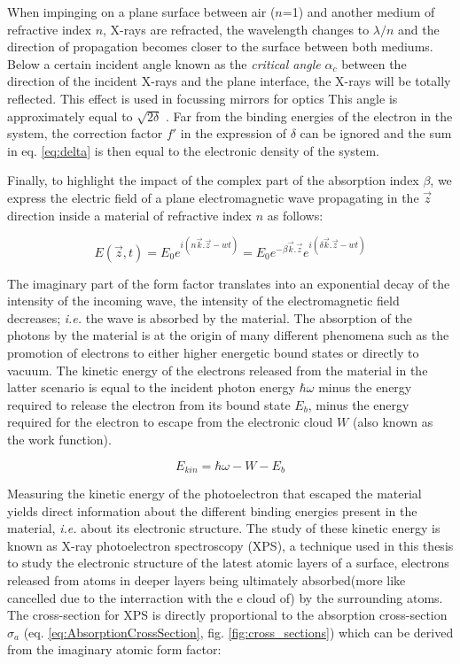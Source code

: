 When impinging on a plane surface between air ($n$=1) and another medium of refractive index $n$, X-rays are refracted, the wavelength changes to $\lambda/n$ and the direction of propagation becomes closer to the surface between both mediums.
Below a certain incident angle known as the \textit{critical angle} $\alpha_c$ between the direction of the incident X-rays and the plane interface, the X-rays will be totally reflected.
This effect is used in focussing mirrors for optics
This angle is approximately equal to $\sqrt{2\delta}$ \parencite{Willmott}.
Far from the binding energies of the electron in the system, the correction factor $f'$ in the expression of $\delta$ can be ignored and the sum in eq. \ref{eq:delta} is then equal to the electronic density of the system.

Finally, to highlight the impact of the complex part of the absorption index $\beta$, we express the electric field of a plane electromagnetic wave propagating in the $\vec{z}$ direction inside a material of refractive index $n$ as follows:

\begin{equation}
    E(\vec{z}, t) = E_0 e^{i(n\vec{k}.\vec{z} - wt)} = E_0 e^{-\beta \vec{k}.\vec{z}} e^{i(\delta\vec{k}.\vec{z} - wt)}
\end{equation}

The imaginary part of the form factor translates into an exponential decay of the intensity of the incoming wave, the intensity of the electromagnetic field decreases; \textit{i.e.} the wave is absorbed by the material.
The absorption of the photons by the material is at the origin of many different phenomena such as the promotion of electrons to either higher energetic bound states or directly to vacuum.
The kinetic energy of the electrons released from the material in the latter scenario is equal to the incident photon energy $\hbar\omega$ minus the energy required to release the electron from its bound state $E_b$, minus the energy required for the electron to escape from the electronic cloud $W$ (also known as the work function).

\begin{equation}
    E_{kin} = \hbar\omega - W - E_b
\end{equation}

Measuring the kinetic energy of the photoelectron that escaped the material yields direct information about the different binding energies present in the material, \textit{i.e.} about its electronic structure.
The study of these kinetic energy is known as X-ray photoelectron spectroscopy (XPS),
a technique used in this thesis to study the electronic structure of the latest atomic layers of a surface, electrons released from atoms in deeper layers being ultimately absorbed(more like cancelled due to the interraction with the e cloud of) by the surrounding atoms.
The cross-section for XPS is directly proportional to the absorption cross-section $\sigma_a$ (eq. \ref{eq:AbsorptionCrossSection}, fig. \ref{fig:cross_sections}) which can be derived from the imaginary atomic form factor:

